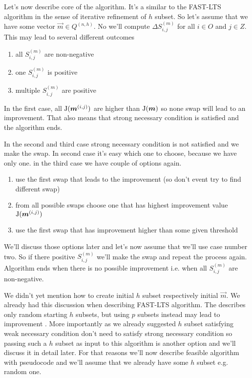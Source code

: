 Let's now describe core of the algorithm. It's a  similar to the FAST-LTS algorithm in the sense of iterative refinement of $h$ subset. So let's assume that we have some vector  $\vec{m} \in Q^{(n,h)}$. No we'll compute  $\Delta S^{(m)}_{i,j}$ for all $i \in O$ and $j \in Z$. This may lead to several different outcomes

\begin{enumerate}
	\item all $S^{(m)}_{i,j}$ are non-negative
	\item one $S^{(m)}_{i,j}$ is positive
	\item multiple $S^{(m)}_{i,j}$ are positive
\end{enumerate}

In the first case, all $\operatorname{J}(\boldsymbol{m}^{(i,j)})$ are higher than $\operatorname{J}(\boldsymbol{m})$ so none swap will lead to an improvement. That also means that strong necessary condition is satisfied and the algorithm ends.

In the second and third case strong necessary condition is not satisfied and we make the swap. In second case it's easy which one to choose, because we have only one. in the third case we have couple of options again. 
\begin{enumerate}
	\item use the first swap that leads to the improvement (so don't event try to find different swap)
	\item from all possible swaps choose one that has highest improvement value  $\operatorname{J}(\boldsymbol{m}^{(i,j)})$
	\item use the first swap that has improvement higher than some given threshold
\end{enumerate}
We'll discuss those options later and let's now assume that we'll use case number two.
So if there positive  $S^{(m)}_{i,j}$ we'll make the swap and repeat the process again. 
Algorithm ends when there is no possible improvement i.e. when all $S^{(m)}_{i,j}$ are non-negative.

We didn't yet mention how to create initial $h$ subset respectively initial $\vec{m}$. We already had this discussion when describing FAST-LTS algorithm. The \cite{hawkins:1994} describes only random starting $h$ subsets, but using $p$ subsets instead may lead to improvement . More importantly as we already suggested $h$ subset satisfying weak necessary condition don't need to satisfy strong necessary condition so passing such a $h$ subset as input to this algorithm is another option and we'll discuss it in detail later. For that reasons we'll now describe feasible algorithm with pseudocode and we'll assume that we already have some $h$ subset e.g. random one.

